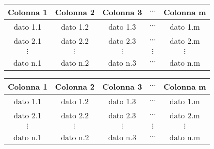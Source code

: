 \documentclass[a4paper,10pt]{article}
\begin{document}
\vspace{10mm}
\begin{tabular}{|c|c|c|c|c|}
\hline
\textbf{Colonna 1} & \textbf{Colonna 2} & \textbf{Colonna 3} & $\cdots$ & \textbf{Colonna m}\\
\hline
dato 1.1 & dato 1.2 & dato 1.3 & $\cdots$ &  dato 1.m \\
\hline
dato 2.1 & dato 2.2 & dato 2.3 & $\cdots$ &  dato 2.m \\
\hline
$\vdots$  & $\vdots$  & $\vdots$ & $\vdots$ &  $\vdots$ \\
\hline
dato n.1 & dato n.2 & dato n.3 & $\cdots$ &  dato n.m \\
\hline
\end{tabular}

\vspace{10mm}
\begin{tabular}{ccccc}
\toprule
\textbf{Colonna 1} & \textbf{Colonna 2} & \textbf{Colonna 3} & $\cdots$ & \textbf{Colonna m}\\
\midrule
dato 1.1 & dato 1.2 & dato 1.3 & $\cdots$ &  dato 1.m \\
dato 2.1 & dato 2.2 & dato 2.3 & $\cdots$ &  dato 2.m \\
$\vdots$  & $\vdots$  & $\vdots$ & $\vdots$ &  $\vdots$ \\
dato n.1 & dato n.2 & dato n.3 & $\cdots$ &  dato n.m \\
\bottomrule
\end{tabular}
\end{document}

